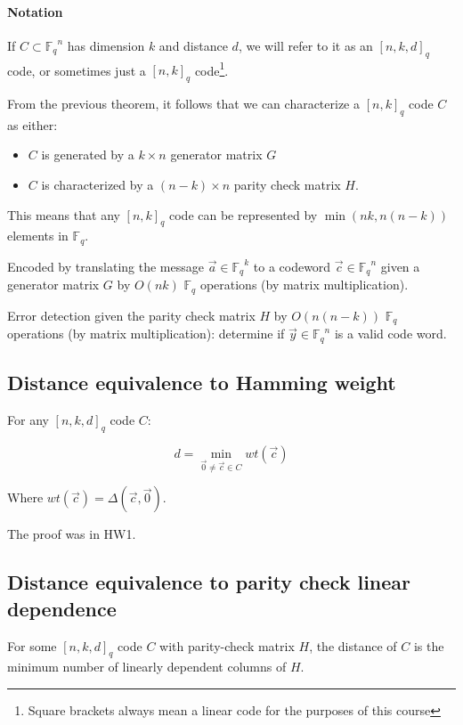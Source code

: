 \documentclass{idc_msc}
\newcommand{\Fq}{{\mathbb{F}_q}}
\begin{document}
\paragraph{Notation}

If \(C \subset \Fq^n\) has dimension \(k\) and distance \(d\), we will refer to it as an \([n,k,d]_q\) code, or sometimes just a \([n,k]_q\) code\footnote{Square brackets always mean a linear code for the purposes of this course}.

From the previous theorem, it follows that we can characterize a \([n,k]_q\) code \(C\) as either:

\begin{itemize}
  \item \(C\) is generated by a \(k \times n\) generator matrix \(G\)
  \item \(C\) is characterized by a \((n-k) \times n\) parity check matrix \(H\).
\end{itemize}

This means that any \([n,k]_q\) code can be represented by \(\min (nk, n(n-k))\) elements in \(\Fq\).

Encoded by translating the message \(\vec{a} \in \Fq^k\) to a codeword \(\vec{c} \in \Fq^n\) given a generator matrix \(G\) by \(O(nk)\) \(\Fq\) operations (by matrix multiplication).

Error detection given the parity check matrix \(H\) by \(O(n(n-k))\) \(\Fq\) operations (by matrix multiplication): determine if \(\vec{y} \in \Fq^n\) is a valid code word.

\subsection{Distance equivalence to Hamming weight}

For any \([n,k,d]_q\) code \(C\):

\[d = \min_{\vec{0} \ne \vec{c} \in C} wt(\vec{c})\]

Where \(wt(\vec{c}) = \Delta (\vec{c}, \vec{0})\).

The proof was in HW1.

\subsection{Distance equivalence to parity check linear dependence}

For some \([n,k,d]_q\) code \(C\) with parity-check matrix \(H\), the distance of \(C\) is the minimum number of linearly dependent columns of \(H\).
\end{document}
